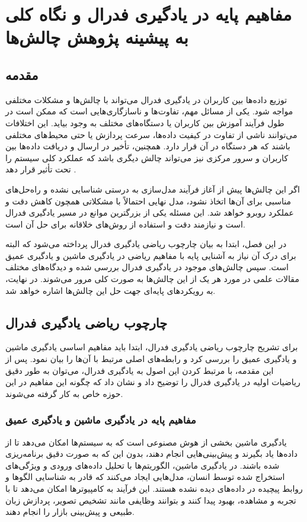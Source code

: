 \chapter{مفاهیم پایه در یادگیری فدرال و نگاه کلی به پیشینه پژوهش چالش‌ها}


\section{مقدمه}
توزیع داده‌ها بین کاربران در یادگیری فدرال می‌تواند با چالش‌ها و مشکلات مختلفی مواجه شود. یکی از مسائل مهم، تفاوت‌ها و ناسازگاری‌هایی است که ممکن است در طول فرآیند آموزش بین کاربران یا دستگاه‌های مختلف به وجود بیاید. این اختلافات می‌توانند ناشی از تفاوت در کیفیت داده‌ها، سرعت پردازش یا حتی محیط‌های مختلفی باشند که هر دستگاه در آن قرار دارد. همچنین، تأخیر در ارسال و دریافت داده‌ها بین کاربران و سرور مرکزی نیز می‌تواند چالش دیگری باشد که عملکرد کلی سیستم را تحت تأثیر قرار دهد
\cite{li2020federated}.

اگر این چالش‌ها پیش از آغاز فرآیند مدل‌سازی به درستی شناسایی نشده و راه‌حل‌های مناسبی برای آن‌ها اتخاذ نشود، مدل نهایی احتمالاً با مشکلاتی همچون کاهش دقت و عملکرد روبرو خواهد شد. این مسئله یکی از بزرگترین موانع در مسیر یادگیری فدرال است و نیازمند دقت و استفاده از روش‌های خلاقانه برای حل آن است.

در این فصل، ابتدا به بیان چارچوب ریاضی یادگیری فدرال پرداخته می‌شود که البته برای درک آن نیاز به آشنایی پایه با مفاهیم ریاضی در یادگیری ماشین و یادگیری عمیق است. سپس چالش‌های موجود در یادگیری فدرال بررسی شده و دیدگاه‌های مختلف مقالات علمی در مورد هر یک از این چالش‌ها به صورت کلی مرور می‌شوند. در نهایت، به رویکردهای پایه‌ای جهت حل این چالش‌ها اشاره خواهد شد.


\section{چارچوب ریاضی یادگیری فدرال}
برای تشریح چارچوب ریاضی یادگیری فدرال، ابتدا باید مفاهیم اساسی یادگیری ماشین و یادگیری عمیق را بررسی کرد و رابطه‌های اصلی مرتبط با آن‌ها را بیان نمود. پس از این مقدمه، با مرتبط کردن این اصول به یادگیری فدرال، می‌توان به طور دقیق ریاضیات اولیه در یادگیری فدرال را توضیح داد و نشان داد که چگونه این مفاهیم در این حوزه خاص به کار گرفته می‌شوند.

\subsection{مفاهیم پایه در یادگیری ماشین و یادگیری عمیق}
یادگیری ماشین بخشی از هوش مصنوعی است که به سیستم‌ها امکان می‌دهد تا از داده‌ها یاد بگیرند و پیش‌بینی‌هایی انجام دهند، بدون این که به صورت دقیق برنامه‌ریزی شده باشند. در یادگیری ماشین، الگوریتم‌ها با تحلیل داده‌های ورودی و ویژگی‌های استخراج شده توسط انسان، مدل‌هایی ایجاد می‌کنند که قادر به شناسایی الگوها و روابط پیچیده در داده‌های دیده نشده هستند. این فرآیند به کامپیوترها امکان می‌دهد تا با تجربه و مشاهده، بهبود پیدا کنند و بتوانند وظایفی مانند تشخیص تصویر، پردازش زبان طبیعی و پیش‌بینی بازار را انجام دهند.

